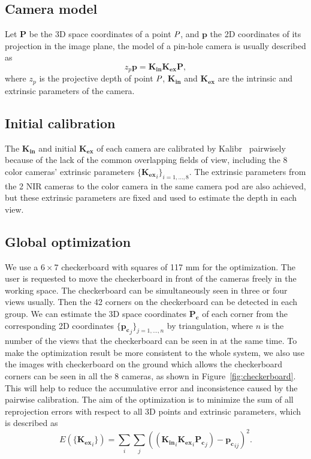 \documentclass{article}
\begin{document}
\subsection{Camera model}
Let $\mathbf{P}$ be the 3D space coordinates of a point $\emph{P}$, and $\mathbf{p}$ the 2D coordinates of its projection in the image plane, the model of a pin-hole camera is usually described as
\begin{equation}
z_{p}\mathbf{p}=\mathbf{K_{in}}\mathbf{K_{ex}}\mathbf{P},
\end{equation}
where $z_{p}$ is the projective depth of point $\emph{P}$, $\mathbf{K_{in}}$ and $\mathbf{K_{ex}}$ are the intrinsic and extrinsic parameters of the camera.
\subsection{Initial calibration}
The $\mathbf{K_{in}}$ and initial $\mathbf{K_{ex}}$ of each camera are calibrated by Kalibr~\cite{Maye2013Self} pairwisely because of the lack of the common overlapping fields of view, including the 8 color cameras' extrinsic parameters $\{\mathbf{K_{ex}}_{i}\}_{i=1,...,8}$. The extrinsic parameters from the 2 NIR cameras to the color camera in the same camera pod are also achieved, but these extrinsic parameters are fixed and used to estimate the depth in each view.

\subsection{Global optimization}

We use a $6\times7$ checkerboard with squares of 117 mm for the optimization. The user is requested to move the checkerboard in front of the cameras freely in the working space. The checkerboard can be simultaneously seen in three or four views usually. Then the 42 corners on the checkerboard can be detected in each group. We can estimate the 3D space coordinates $\mathbf{P_{c}}$ of each corner from the corresponding 2D coordinates $\{\mathbf{p_{c}}_{j}\}_{j=1,...,n}$ by triangulation, where $n$ is the number of the views that the checkerboard can be seen in at the same time. To make the optimization result be more consistent to the whole system, we also use the images with checkerboard on the ground which allows the checkerboard corners can be seen in all the 8 cameras,  as shown in Figure~\ref{fig:checkerboard}. This will help to reduce the accumulative error and inconsistence caused by the pairwise calibration. The aim of the optimization is to minimize the sum of all reprojection errors with respect to all 3D points and extrinsic parameters, which is described as
\begin{equation}
E(\{\mathbf{K_{ex}}_{i}\})=\sum_{i}\sum_{j}((\mathbf{K_{in}}_{i}\mathbf{K_{ex}}_{i}\mathbf{P_{c}}_{j})-\mathbf{p_{c}}_{ij})^{2}.
\end{equation}
\end{document}
